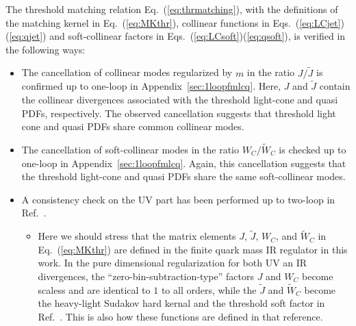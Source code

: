 \documentclass[a4paper,11pt]{article}
\begin{document}
The threshold matching relation Eq.~(\ref{eq:thrmatching}), with the definitions of the matching kernel in Eq.~(\ref{eq:MKthr}), collinear functions in Eqs.~(\ref{eq:LCjet})(\ref{eq:qjet}) and soft-collinear factors in Eqs.~(\ref{eq:LCsoft})(\ref{eq:qsoft}), is verified in the following ways:
\begin{itemize}
    \item The cancellation of collinear modes regularized by $m$ in the ratio $J/\tilde{J}$ is confirmed up to one-loop in Appendix~\ref{sec:1loopfmlcq}. Here, $J$ and $\tilde{J}$ contain the collinear divergences associated with the threshold light-cone and quasi PDFs, respectively. The observed cancellation suggests that threshold light cone and quasi PDFs share common collinear modes.
    
    \item The cancellation of soft-collinear modes in the ratio $W_C/\tilde{W}_C$ is checked up to one-loop in Appendix~\ref{sec:1loopfmlcq}. Again, this cancellation suggests that the threshold light-cone and quasi PDFs share the same soft-collinear modes.
    
    \iffalse
    \item A consistency check on the UV part has been performed up to two-loop in Ref.~\cite{Ji:2023pba}.
    \begin{itemize}
        \item Here we should stress that the matrix elements 
        $J$, $\tilde J$, $W_C$, and $\tilde{W}_C$ in Eq.~(\ref{eq:MKthr}) are defined in the finite quark mass IR regulator in this work. In the pure dimensional regularization for both UV an IR divergences, the ``zero-bin-subtraction-type'' factors $J$ and $W_C$ become scaless and are identical to $1$ to all orders, while the $\tilde J$ and $\tilde W_C$ become the heavy-light Sudakov hard kernal and the threshold soft factor in Ref.~\cite{Ji:2023pba}. This is also how these functions are defined in that reference. 


\end{itemize}
\end{itemize}
\end{document}

